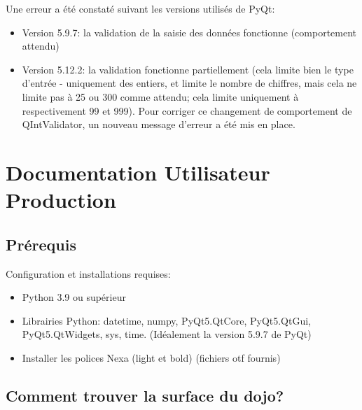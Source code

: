 Une erreur a été constaté suivant les versions utilisés de PyQt:
\begin{itemize}
    \item Version 5.9.7: la validation de la saisie des données fonctionne (comportement attendu)
    \item Version 5.12.2: la validation fonctionne partiellement (cela limite bien le type d'entrée - uniquement
          des entiers, et limite le nombre de chiffres, mais cela ne limite pas à 25 ou 300 comme attendu; cela limite
          uniquement à respectivement 99 et 999). Pour corriger ce changement de comportement de QIntValidator, un
          nouveau message d’erreur a été mis en place.
\end{itemize}

\section{Documentation Utilisateur Production}

\subsection{Prérequis}

Configuration et installations requises:

\begin{itemize}
    \item Python 3.9 ou supérieur
    \item Librairies Python: datetime, numpy, PyQt5.QtCore, PyQt5.QtGui, PyQt5.QtWidgets, sys, time.
          (Idéalement la version 5.9.7 de PyQt)
    \item Installer les polices Nexa (light et bold) (fichiers otf fournis)
\end{itemize}


\subsection{Comment trouver la surface du dojo?}


